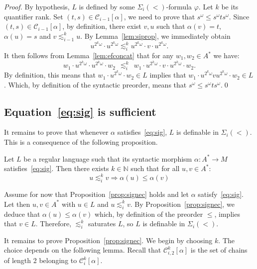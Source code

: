 \documentclass[envcountsame]{llncs}
\newcommand\nat{\ensuremath{\mathbb{N}}\xspace}
\newcommand\Cs{\ensuremath{\mathcal{C}}\xspace}
\newcommand\Csgen[3]{\ensuremath{\Cs_{#1,#3}^{#2}}\xspace}
\newcommand\Csik{\ensuremath{\Cs_i^k}\xspace}
\newcommand{\siw}[1]{\ensuremath{\Sigma_{#1}(<)}\xspace}
\newcommand\sieq[2]{\ensuremath{\lesssim^{#1}_{#2}}\xspace}
\newcommand\ksieq[1]{\sieq{k}{#1}}
\newcommand\lmo{\ensuremath{\leqslant}\xspace}
\begin{document}
\begin{proof}
  By hypothesis, $L$ is defined by some \siw{i}-formula $\varphi$. Let $k$ be
  its quantifier rank. Set $(t,s) \in \Cs_{i-1}[\alpha]$, we need to prove
  that $s^{\omega} \lmo s^{\omega}ts^{\omega}$. Since $(t,s) \in
  \Cs_{i-1}[\alpha]$, by definition, there exist $v,u$ such that $\alpha(v) =
  t$, $\alpha(u) = s$ and $v \ksieq{i-1} u$.  By Lemma~\ref{lem:siprop}, we
  immediately obtain
  \[
  u^{2^k\omega}\cdot u^{2^k\omega} \ksieq{i}u^{2^k\omega} \cdot v \cdot
  u^{2^k\omega}.
  \]
  It then follows from Lemma~\ref{lem:efconcat} that for any $w_1,w_2 \in A^*$
  we have:
  \begin{equation} \label{eq:efcorrec} w_1 \cdot u^{2^k\omega}\cdot
    u^{2^k\omega} \cdot w_2 ~~\ksieq{i}~~ w_1 \cdot u^{2^k\omega} \cdot v
    \cdot u^{2^k\omega} \cdot w_2.
  \end{equation}
  By definition, this means that $w_1 \cdot u^{2^k\omega} \cdot w_2 \in L$
  implies that $w_1 \cdot u^{2^k\omega} v u^{2^k\omega} \cdot w_2 \in
  L$. Which, by definition of the syntactic preorder, means that $s^{\omega}
  \lmo s^{\omega}ts^{\omega}$.\qed
\end{proof}


\subsection{Equation~\eqref{eq:sig} is sufficient}

It remains to prove that whenever $\alpha$ satisfies~\eqref{eq:sig},
$L$ is definable in \siw{i}. This is a consequence of the following
proposition.

\begin{proposition} \label{prop:signec}
  Let $L$ be a regular language such that its syntactic morphism $\alpha
  : A^* \rightarrow M$ satisfies~\eqref{eq:sig}. Then there exists $k
  \in \nat$ such that for all $u,v \in A^*$:
  \[
  u \ksieq{i} v \Rightarrow \alpha(u) \lmo \alpha(v)
  \]
\end{proposition}
Assume for now that Proposition~\ref{prop:signec} holds and let
$\alpha$ satisfy~\eqref{eq:sig}. Let then $u,v\in A^*$ with $u\in L$
and $u \ksieq{i} v$. By Proposition~\ref{prop:signec}, we deduce that
$\alpha(u)\lmo\alpha(v)$ which, by definition of the preorder $\lmo$,
implies that $v\in L$. Therefore, $\ksieq i$ saturates $L$, so $L$ is
definable in \siw{i}.

It remains to prove Proposition~\ref{prop:signec}. We begin by
choosing $k$. The choice depends on the following lemma. Recall that
$\Csgen{i}{k}{2}[\alpha]$ is the set of chains of length 2 belonging
to $\Csik[\alpha]$.
\end{document}
